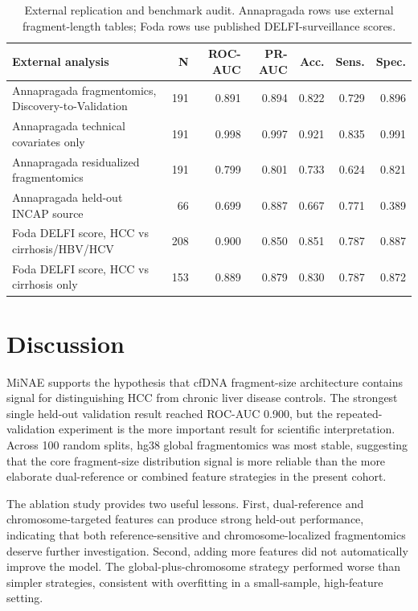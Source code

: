 \documentclass[conference]{IEEEtran}
\begin{document}
\begin{table}[t]
\centering
\caption{External replication and benchmark audit. Annapragada rows use external fragment-length tables; Foda rows use published DELFI-surveillance scores.}
\label{tab:external}
\begin{tabular}{lrrrrrr}
\toprule
External analysis & N & ROC-AUC & PR-AUC & Acc. & Sens. & Spec. \\
\midrule
Annapragada fragmentomics, Discovery-to-Validation & 191 & 0.891 & 0.894 & 0.822 & 0.729 & 0.896 \\
Annapragada technical covariates only & 191 & 0.998 & 0.997 & 0.921 & 0.835 & 0.991 \\
Annapragada residualized fragmentomics & 191 & 0.799 & 0.801 & 0.733 & 0.624 & 0.821 \\
Annapragada held-out INCAP source & 66 & 0.699 & 0.887 & 0.667 & 0.771 & 0.389 \\
Foda DELFI score, HCC vs cirrhosis/HBV/HCV & 208 & 0.900 & 0.850 & 0.851 & 0.787 & 0.887 \\
Foda DELFI score, HCC vs cirrhosis only & 153 & 0.889 & 0.879 & 0.830 & 0.787 & 0.872 \\
\bottomrule
\end{tabular}
\end{table}

\section{Discussion}
MiNAE supports the hypothesis that cfDNA fragment-size architecture contains signal for distinguishing HCC from chronic liver disease controls. The strongest single held-out validation result reached ROC-AUC 0.900, but the repeated-validation experiment is the more important result for scientific interpretation. Across 100 random splits, hg38 global fragmentomics was most stable, suggesting that the core fragment-size distribution signal is more reliable than the more elaborate dual-reference or combined feature strategies in the present cohort.

The ablation study provides two useful lessons. First, dual-reference and chromosome-targeted features can produce strong held-out performance, indicating that both reference-sensitive and chromosome-localized fragmentomics deserve further investigation. Second, adding more features did not automatically improve the model. The global-plus-chromosome strategy performed worse than simpler strategies, consistent with overfitting in a small-sample, high-feature setting.
\end{document}
